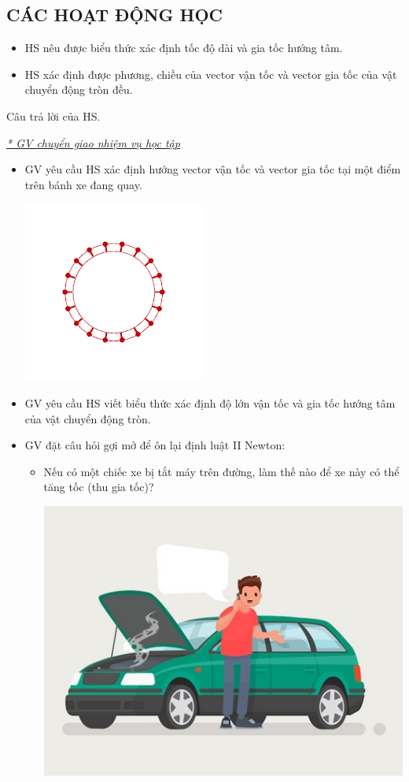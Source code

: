 \subsection{CÁC HOẠT ĐỘNG HỌC}
{
\begin{itemize}
	\item HS nêu được biểu thức xác định tốc độ dài và gia tốc hướng tâm.
	\item HS xác định được phương, chiều của vector vận tốc và vector gia tốc của vật chuyển động tròn đều.
	\end{itemize}}
{Câu trả lời của HS.
}
{\textit{\underline{* GV chuyển giao nhiệm vụ học tập}}\\
	\begin{itemize}[label=$-$]
		\item GV yêu cầu HS xác định hướng vector vận tốc và vector gia tốc tại một điểm trên bánh xe đang quay.
		\begin{center}
	\includegraphics[scale=0.6]{figs/G10-BAI21-1}
		\end{center}
		\item GV yêu cầu HS viết biểu thức xác định độ lớn vận tốc và gia tốc hướng tâm của vật chuyển động tròn.
		\item GV đặt câu hỏi gợi mở để ôn lại định luật II Newton:
		\begin{itemize}[label=$\bullet$]
			\item Nếu có một chiếc xe bị tắt máy trên đường, làm thế nào để xe này có thể tăng tốc (thu gia tốc)?
			\begin{center}
				\includegraphics[scale=0.5]{figs/G10-BAI21-2}

\end{center}
\end{itemize}
\end{itemize}}
